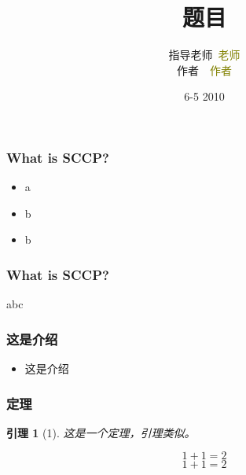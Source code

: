 \documentclass[CJK,notheorems,mathserif,table]{beamer}
\title{\heiti 题目}
\author[\textcolor{white}{\songti 作者~XX君}]{{\songti 指导老师~\textcolor{olive}{老师}}\\{\songti 作者~~\textcolor{olive}{作者}}}
\institute{\wuhao \lishu \textcolor{violet}{a大学~~XX系 }}
\date{6-5 2010}
\newtheorem{lemma}{引理}
\begin{document}
 \begin{CJK*}{GBK}{kai}

\begin{frame}
	\titlepage
\end{frame}
\begin{frame}
\frametitle{What is SCCP?}
\begin{itemize}
 \item a
 \item b
 \item b
\end{itemize}
\end{frame}
\begin{frame}
\frametitle{What is SCCP?}
abc
\end{frame}
\begin{frame}
\frametitle{这是介绍}
\begin{itemize}
 \item 这是介绍
\end{itemize}
\end{frame}
\begin{frame}
\frametitle{定理}
\begin{lemma}[1]
这是一个定理，引理类似。
\end{lemma}
\pause                       %
\begin{displaymath}             %
1+1=2
\end{displaymath}
\begin{equation}
1+1=2
\end{equation}
\end{frame}

\end{CJK*}
\end{document}
